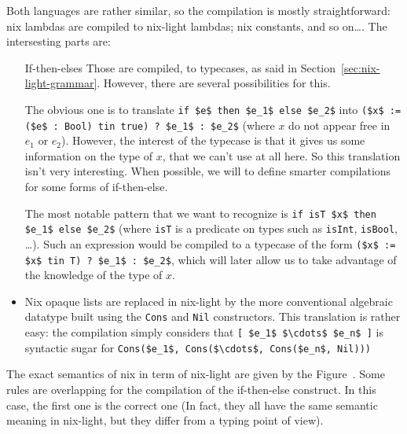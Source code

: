 Both languages are rather similar, so the compilation is mostly
straightforward: nix lambdas are compiled to nix-light lambdas; nix constants,
and so on\ldots. The intersesting parts are:

\begin{itemize}
  \item[If-then-elses] Those are compiled, to typecases, as said in
    Section~\ref{sec:nix-light-grammar}. However, there are several
    possibilities for this.

    The obvious one is to translate \lstinline{if $e$ then $e_1$ else $e_2$} into
    \lstinline{($x$ := ($e$ : Bool) tin true) ? $e_1$ : $e_2$} (where $x$ do not appear
    free in $e_1$ or $e_2$).
    However, the interest of the typecase is that it gives us some information
    on the type of $x$, that we can't use at all here. So this translation
    isn't very interesting.
    When possible, we will  to define smarter compilations for some forms of
    if-then-else.

    The most notable pattern that we want to recognize is
    \lstinline{if isT $x$ then $e_1$ else $e_2$}
    (where \lstinline{isT} is a predicate on types such as
    \lstinline{isInt}, \lstinline{isBool}, \ldots).
    Such an expression would be compiled to a typecase of the form
    \lstinline{($x$ := $x$ tin T) ? $e_1$ : $e_2$}, which will later allow us to take
    advantage of the knowledge of the type of $x$.

  \item[Lists] Nix opaque lists are replaced in nix-light by the more
    conventional algebraic datatype built using the \lstinline{Cons} and
    \lstinline{Nil} constructors.
    This translation is rather easy: the compilation simply considers that
    \lstinline{[ $e_1$ $\cdots$ $e_n$ ]} is syntactic sugar for
    \lstinline{Cons($e_1$, Cons($\cdots$, Cons($e_n$, Nil)))} %
\end{itemize}

The exact semantics of nix in term of nix-light are given by the
Figure~.
Some rules are overlapping for the compilation of the if-then-else
construct. In this case, the first one is the correct one (In fact, they all
have the same semantic meaning in nix-light, but they differ from a typing
point of view).

